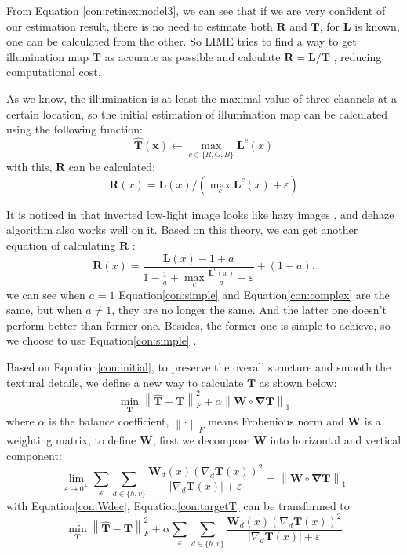 \documentclass[10pt,twocolumn,letterpaper]{article}
\begin{document}
 From Equation \ref{con:retinexmodel3}, we can see that if we are very confident of our estimation result, there is no need to estimate both $\mathbf{R}$ and $\mathbf{T}$, for $\mathbf{L}$ is known, one can be calculated from the other. So LIME tries to find a way to get illumination map $\mathbf{T}$ as accurate as possible and calculate $\mathbf{ R = L / T}$ , reducing computational cost.
 
As we know, the illumination is at least the maximal value of three channels at a certain location, so the initial estimation of illumination map can be calculated using the following function:
\begin{equation}
    \mathbf{\hat{T}(x)} \leftarrow \max_{c \in \{ R,G,B\}} \mathbf{L}^c(x) \label{con:initial}
\end{equation}
with this, $\mathbf{R}$ can be calculated:
\begin{equation}
    \mathbf{R}(x) = \mathbf{L}(x)/(\max_c \mathbf{L}^c(x)+ \varepsilon) \label{con:simple}
\end{equation}

It is noticed in \cite{dong2011fast} that inverted low-light image looks like hazy images , and dehaze algorithm also works well on it. Based on this theory, we can get another equation of calculating $\mathbf{R}$ :
\begin{equation}
    \mathbf{R}(x) = \frac{\mathbf{L}(x) -1 + a }{1- \frac{1}{a} + \max_c \frac{\mathbf{L}^c(x)}{a} + \varepsilon } + (1-a). \label{con:complex}
\end{equation}
we can see when $a = 1 $ Equation\ref{con:simple} and Equation\ref{con:complex} are the same, but when $a \not = 1$, they are no longer the same. And the latter one doesn't perform better than former one. Besides, the former one is simple to achieve, so we choose to use Equation\ref{con:simple} .

Based on Equation\ref{con:initial}, to preserve the overall structure and smooth the textural details, we define a new way to calculate $\mathbf{T}$ as shown below:
\begin{equation}
    \min_{\mathbf{T}}\left\|\mathbf{\hat{T} - T}\right\|_F^2 + \alpha \left\|\mathbf{W \circ \nabla T}\right\|_1 \label{con:targetT}
\end{equation}
where $\alpha$ is the balance coefficient, $\left\|\mathbf{ \cdot }\right\|_F$ means Frobenious norm and $\mathbf{W}$ is a weighting matrix, to define $\mathbf{W}$, first we decompose $\mathbf{W}$ into horizontal and vertical component:
\begin{equation}
    \lim_{\varepsilon \rightarrow 0^+}\sum_x \sum_{d \in \{h,v\}}\frac{\mathbf{W}_d(x)(\nabla_d \mathbf{T}(x))^2}{|\nabla_d \mathbf{T}(x)| + \varepsilon} = \left\|\mathbf{W \circ \nabla T }\right\|_1  \label{con:Wdec}
\end{equation}
with Equation\ref{con:Wdec}, Equation\ref{con:targetT} can be transformed to
\begin{equation}
     \min_{\mathbf{T}}\left\|\mathbf{\hat{T} - T}\right\|_F^2 + \alpha \sum_x \sum_{d \in \{h,v\}}\frac{\mathbf{W}_d(x)(\nabla_d \mathbf{T}(x))^2}{|\nabla_d \mathbf{T}(x)| + \varepsilon}
\end{equation}
 
\end{document}
